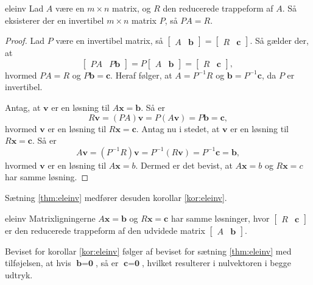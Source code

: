 %
%
\begin{thm}{}{eleinv}
Lad $A$ være en $m \times n$ matrix, og $R$ den reducerede trappeform af $A$. 
Så eksisterer der en invertibel $m \times n$ matrix $P$, så $PA=R$.
\end{thm}
%
\begin{proof}
Lad $P$ være en invertibel matrix, så 
$
\begin{bmatrix}
A & \textbf{b}
\end{bmatrix}
=
\begin{bmatrix}
R & \textbf{c}
\end{bmatrix}
$.
Så gælder der, at 
$$
\begin{bmatrix}
PA & P\textbf{b}
\end{bmatrix}
=P
\begin{bmatrix}
A & \textbf{b}
\end{bmatrix}
=
\begin{bmatrix}
R & \textbf{c}
\end{bmatrix}
\text{, }
$$
hvormed $PA=R$ og $P\textbf{b}=\textbf{c}$.
Heraf følger, at $A=P^{-1}R$ og $\textbf{b}=P^{-1}\textbf{c}$, da $P$ er invertibel. 

Antag, at $\textbf{v}$ er en løsning til $A\textbf{x}=\textbf{b}$. Så er
$$
R\textbf{v}=(PA)\textbf{v}=P(A\textbf{v})=P\textbf{b}=\textbf{c},
$$
hvormed $\textbf{v}$ er en løsning til $R\textbf{x}=\textbf{c}$. 
Antag nu i stedet, at $\textbf{v}$ er en løsning til $R\textbf{x}=\textbf{c}$. Så er
$$
A\textbf{v}=(P^{-1}R)\textbf{v}=P^{-1}(R\textbf{v})=P^{-1}\textbf{c}=\textbf{b},
$$
hvormed $\textbf{v}$ er en løsning til $A\textbf{x}=b$. Dermed er det bevist, at $A\textbf{x}=b$ og $R\textbf{x}=c$ har samme løsning.
\end{proof}
%
\noindent
Sætning \ref{thm:eleinv} medfører desuden korollar \ref{kor:eleinv}.
\begin{kor}{}{eleinv}
Matrixligningerne $A\textbf{x}=\textbf{b}$ og $R\textbf{x}=\textbf{c}$ har samme løsninger, hvor 
$
\begin{bmatrix}
R & \textbf{c}
\end{bmatrix}
$
er den reducerede trappeform af den udvidede matrix 
$
\begin{bmatrix}
A & \textbf{b}
\end{bmatrix}
$.
\end{kor}
Beviset for korollar \ref{kor:eleinv} følger af beviset for sætning \ref{thm:eleinv} med tilføjelsen, at hvis $\textbf{b}=\textbf{0}$, så er $\textbf{c}=\textbf{0}$, hvilket resulterer i nulvektoren i begge udtryk. 
